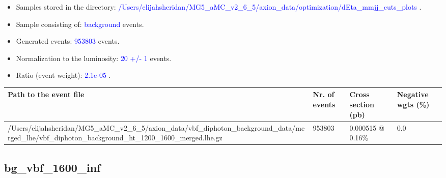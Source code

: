 \documentclass[a4paper, 10pt]{article}
\begin{document}
\begin{itemize}
  \item Samples stored in the directory: \textcolor{blue}{/\-Users/\-elijahsheridan/\-MG5\_aMC\_v2\_6\_5/\-axion\_data/\-optimization/\-dEta\_mmjj\_cuts\_plots} .
   \item Sample consisting of: \textcolor{blue}{background}  events.
   \item Generated events: \textcolor{blue}{953803 }  events.
   \item Normalization to the luminosity: \textcolor{blue}{20}\textcolor{blue}{ +/\-- }\textcolor{blue}{1 }  events.
   \item Ratio (event weight): \textcolor{blue}{2.1e-05 } .  
 
\end{itemize}
\begin{table}[H]
  \begin{center}
    \begin{tabular}{|m{55.0mm}|m{25.0mm}|m{30.0mm}|m{30.0mm}|}
      \hline
      {\cellcolor{yellow}         Path to the event file}& {\cellcolor{yellow}         Nr. of events}& {\cellcolor{yellow}         Cross section (pb)}& {\cellcolor{yellow}         Negative wgts (\%)}\\
      \hline
      {\cellcolor{white}          /\-Users/\-elijahsheridan/\-MG5\_aMC\_v2\_6\_5/\-axion\_data/\-vbf\_diphoton\_background\_data/\-merged\_lhe/\-vbf\_diphoton\_background\_ht\_1200\_1600\_merged.lhe.gz}& {\cellcolor{white}          953803}& {\cellcolor{white}          0.000515 @ 0.16\%}& {\cellcolor{white}          0.0}\\
\hline
    \end{tabular}
  \end{center}
\end{table}

\subsection{ bg\_vbf\_1600\_inf}
\end{document}
